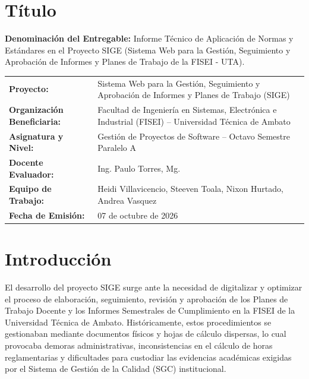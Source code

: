 \documentclass[12pt,a4paper]{article}
\begin{document}
\section{Título}
\textbf{Denominación del Entregable:} Informe Técnico de Aplicación de Normas y Estándares en el Proyecto SIGE (Sistema Web para la Gestión, Seguimiento y Aprobación de Informes y Planes de Trabajo de la FISEI - UTA).

\begin{table}[h!]
\centering
\small
\renewcommand{\arraystretch}{1.15}
\begin{tabularx}{\textwidth}{|p{4.2cm}|X|}
\hline
\rowcolor{tableheader}
\multicolumn{2}{|c|}{\textbf{DATOS GENERALES DEL PROYECTO INSTITUCIONAL}} \\ \hline
\textbf{Proyecto:} & Sistema Web para la Gestión, Seguimiento y Aprobación de Informes y Planes de Trabajo (SIGE) \\ \hline
\textbf{Organización Beneficiaria:} & Facultad de Ingeniería en Sistemas, Electrónica e Industrial (FISEI) -- Universidad Técnica de Ambato \\ \hline
\textbf{Asignatura y Nivel:} & Gestión de Proyectos de Software -- Octavo Semestre Paralelo A \\ \hline
\textbf{Docente Evaluador:} & Ing. Paulo Torres, Mg. \\ \hline
\textbf{Equipo de Trabajo:} & Heidi Villavicencio, Steeven Toala, Nixon Hurtado, Andrea Vasquez \\ \hline
\textbf{Fecha de Emisión:} & 07 de octubre de 2026 \\ \hline
\end{tabularx}
\end{table}

\section{Introducción}
El desarrollo del proyecto SIGE surge ante la necesidad de digitalizar y optimizar el proceso de elaboración, seguimiento, revisión y aprobación de los Planes de Trabajo Docente y los Informes Semestrales de Cumplimiento en la FISEI de la Universidad Técnica de Ambato. Históricamente, estos procedimientos se gestionaban mediante documentos físicos y hojas de cálculo dispersas, lo cual provocaba demoras administrativas, inconsistencias en el cálculo de horas reglamentarias y dificultades para custodiar las evidencias académicas exigidas por el Sistema de Gestión de la Calidad (SGC) institucional.
\end{document}
